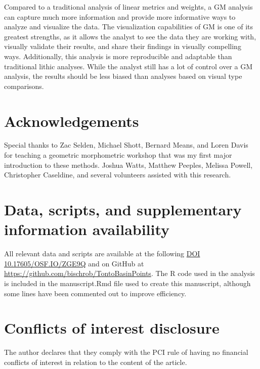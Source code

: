 \documentclass[letterpaper]{article}
\begin{document}
Compared to a traditional analysis of linear metrics and weights, a GM analysis can capture much more information and provide more informative ways to analyze and visualize the data. The visualization capabilities of GM is one of its greatest strengths, as it allows the analyst to see the data they are working with, visually validate their results, and share their findings in visually compelling ways. Additionally, this analysis is more reproducible and adaptable than traditional lithic analyses. While the analyst still has a lot of control over a GM analysis, the results should be less biased than analyses based on visual type comparisons.

\hypertarget{acknowledgements}{%
\section*{Acknowledgements}\label{acknowledgements}}

Special thanks to Zac Selden, Michael Shott, Bernard Means, and Loren Davis for teaching a geometric morphometric workshop that was my first major introduction to these methods. Joshua Watts, Matthew Peeples, Melissa Powell, Christopher Caseldine, and several volunteers assisted with this research.

\hypertarget{data-scripts-and-supplementary-information-availability}{%
\section*{Data, scripts, and supplementary information availability}\label{data-scripts-and-supplementary-information-availability}}

All relevant data and scripts are available at the following \href{https://osf.io/zge9q/}{DOI 10.17605/OSF.IO/ZGE9Q} and on GitHub at \url{https://github.com/bischrob/TontoBasinPoints}. The R code used in the analysis is included in the manuscript.Rmd file used to create this manuscript, although some lines have been commented out to improve efficiency.

\hypertarget{conflicts-of-interest-disclosure}{%
\section*{Conflicts of interest disclosure}\label{conflicts-of-interest-disclosure}}

The author declares that they comply with the PCI rule of having no financial conflicts of interest in relation to the content of the article.

\nocite{Oliver1997-lk}

\printbibliography[notcategory=ignore]              %
\end{document}
